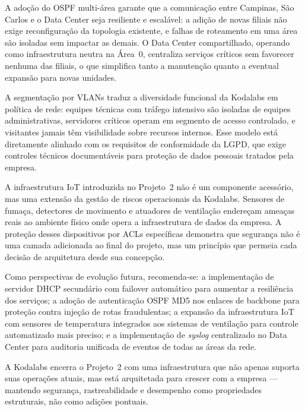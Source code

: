 \documentclass[12pt,a4paper]{article}
\begin{document}
A adoção do OSPF multi-área garante que a comunicação entre Campinas, São Carlos e
o Data Center seja resiliente e escalável: a adição de novas filiais não exige
reconfiguração da topologia existente, e falhas de roteamento em uma área são
isoladas sem impactar as demais. O Data Center compartilhado, operando como
infraestrutura neutra na Área~0, centraliza serviços críticos sem favorecer
nenhuma das filiais, o que simplifica tanto a manutenção quanto a eventual expansão
para novas unidades.

A segmentação por VLANs traduz a diversidade funcional da Kodalabs em política de
rede: equipes técnicas com tráfego intensivo são isoladas de equipes administrativas,
servidores críticos operam em segmento de acesso controlado, e visitantes jamais
têm visibilidade sobre recursos internos. Esse modelo está diretamente alinhado com
os requisitos de conformidade da LGPD, que exige controles técnicos documentáveis
para proteção de dados pessoais tratados pela empresa.

A infraestrutura IoT introduzida no Projeto~2 não é um componente acessório, mas
uma extensão da gestão de riscos operacionais da Kodalabs. Sensores de fumaça,
detectores de movimento e atuadores de ventilação endereçam ameaças reais ao
ambiente físico onde opera a infraestrutura de dados da empresa. A proteção desses
dispositivos por ACLs específicas demonstra que segurança não é uma camada
adicionada ao final do projeto, mas um princípio que permeia cada decisão de
arquitetura desde sua concepção.

Como perspectivas de evolução futura, recomenda-se: a implementação de servidor
DHCP secundário com failover automático para aumentar a resiliência dos serviços;
a adoção de autenticação OSPF MD5 nos enlaces de backbone para proteção contra
injeção de rotas fraudulentas; a expansão da infraestrutura IoT com sensores de
temperatura integrados aos sistemas de ventilação para controle automatizado mais
preciso; e a implementação de \textit{syslog} centralizado no Data Center para
auditoria unificada de eventos de todas as áreas da rede.

A Kodalabs encerra o Projeto~2 com uma infraestrutura que não apenas suporta suas
operações atuais, mas está arquitetada para crescer com a empresa — mantendo
segurança, rastreabilidade e desempenho como propriedades estruturais, não como
adições pontuais.
\newpage

\nocite{*} %


\end{document}
